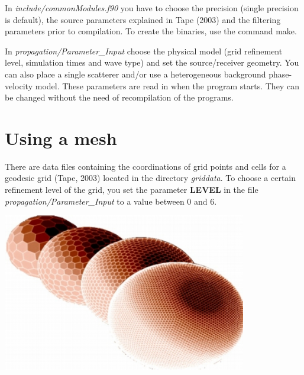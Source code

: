 \documentclass[a4paper,
                          headsepline,
                          listof=totoc,
                          toc=listof,
                          headings=small]{scrreprt} %
\begin{document}
In \textit{include/commonModules.f90} you have to choose the precision (single 
precision is default), the source parameters explained in {Tape} (2003) 
and the filtering parameters prior to compilation. To create the binaries, use
the command \textsf{make}.


In \textit{propagation/Parameter\_Input} choose the physical model (grid refinement level,
simulation times and wave type) and set the source/receiver geometry. You can also place 
a single scatterer and/or use a heterogeneous background phase-velocity model. These
parameters are read in when the program starts. They can be changed without 
the need of recompilation of the programs.




\chapter{Using a mesh}
There are data files containing the coordinations of grid points and cells for a geodesic grid
({Tape}, 2003) located in the directory \textit{griddata}. To choose a certain refinement level 
of the grid, you set the parameter \textbf{LEVEL} in the file \textit{propagation/Parameter\_Input} 
to a value between $0$ and $6$.

\vspace{2cm}
\begin{center}
\includegraphics[width=0.8\textwidth]{figures/spheres.jpg}
\end{center}
\end{document}
